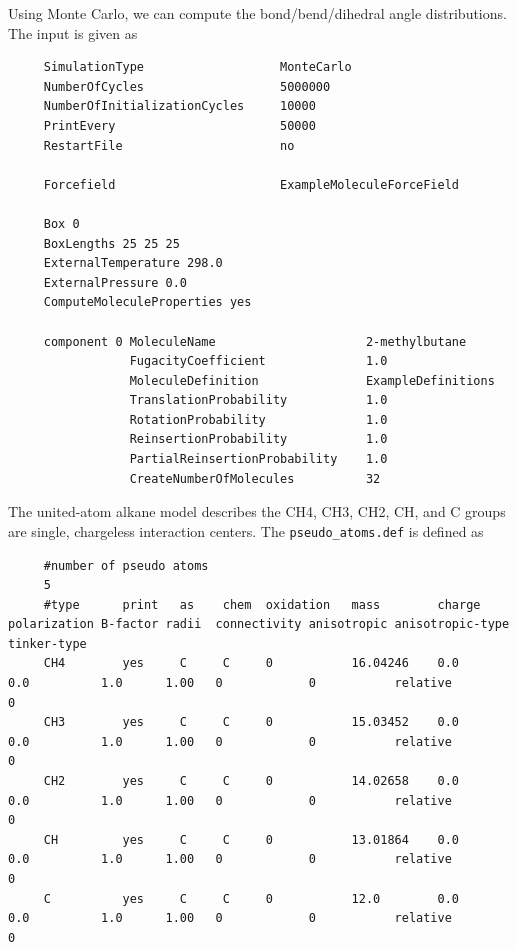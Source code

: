 Using Monte Carlo, we can compute the bond/bend/dihedral angle distributions.
The input is given as
\begin{tiny}
\begin{verbatim}
     SimulationType                   MonteCarlo
     NumberOfCycles                   5000000
     NumberOfInitializationCycles     10000
     PrintEvery                       50000
     RestartFile                      no
     
     Forcefield                       ExampleMoleculeForceField
     
     Box 0
     BoxLengths 25 25 25
     ExternalTemperature 298.0
     ExternalPressure 0.0
     ComputeMoleculeProperties yes
     
     component 0 MoleculeName                     2-methylbutane
                 FugacityCoefficient              1.0
                 MoleculeDefinition               ExampleDefinitions
                 TranslationProbability           1.0
                 RotationProbability              1.0
                 ReinsertionProbability           1.0
                 PartialReinsertionProbability    1.0
                 CreateNumberOfMolecules          32
\end{verbatim}
\end{tiny}
The united-atom alkane model describes the CH4, CH3, CH2, CH, and C groups are single, chargeless interaction centers.
The \verb+pseudo_atoms.def+ is defined as
\begin{tiny}
\begin{verbatim}
     #number of pseudo atoms
     5
     #type      print   as    chem  oxidation   mass        charge   polarization B-factor radii  connectivity anisotropic anisotropic-type   tinker-type
     CH4        yes     C     C     0           16.04246    0.0      0.0          1.0      1.00   0            0           relative           0
     CH3        yes     C     C     0           15.03452    0.0      0.0          1.0      1.00   0            0           relative           0
     CH2        yes     C     C     0           14.02658    0.0      0.0          1.0      1.00   0            0           relative           0
     CH         yes     C     C     0           13.01864    0.0      0.0          1.0      1.00   0            0           relative           0
     C          yes     C     C     0           12.0        0.0      0.0          1.0      1.00   0            0           relative           0
\end{verbatim}
\end{tiny}

